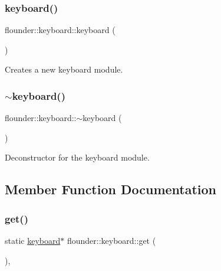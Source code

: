 \subsubsection{\texorpdfstring{keyboard()}{keyboard()}}
{\footnotesize\ttfamily flounder\+::keyboard\+::keyboard (\begin{DoxyParamCaption}{ }\end{DoxyParamCaption})}



Creates a new keyboard module. 

\mbox{\label{classflounder_1_1keyboard_ac78be35918c4741e37bc0d35976f5a4a}} 
\subsubsection{\texorpdfstring{$\sim$keyboard()}{~keyboard()}}
{\footnotesize\ttfamily flounder\+::keyboard\+::$\sim$keyboard (\begin{DoxyParamCaption}{ }\end{DoxyParamCaption})\hspace{0.3cm}{\ttfamily [override]}}



Deconstructor for the keyboard module. 



\subsection{Member Function Documentation}
\mbox{\label{classflounder_1_1keyboard_a7493bf7e18bf4b5fc7679a3e8b10ec27}} 
\subsubsection{\texorpdfstring{get()}{get()}}
{\footnotesize\ttfamily static \hyperlink{classflounder_1_1keyboard}{keyboard}$\ast$ flounder\+::keyboard\+::get (\begin{DoxyParamCaption}{ }\end{DoxyParamCaption})\hspace{0.3cm}{\ttfamily [inline]}, {\ttfamily [static]}}



